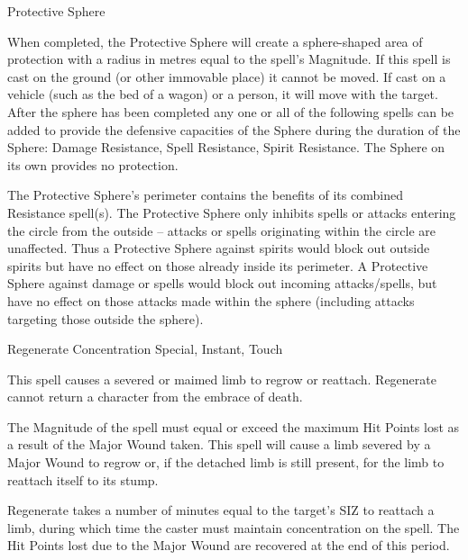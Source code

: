 \begin{rpg-spell}
{Protective Sphere}
{}

When completed, the Protective Sphere will create a sphere-shaped area of protection with a radius in metres equal to the spell’s Magnitude. If this spell is cast on the ground (or other immovable place) it cannot be moved. If cast on a vehicle (such as the bed of a wagon) or a person, it will move with the target. After the sphere has been completed any one or all of the following spells can be added to provide the defensive capacities of the Sphere during the duration of the Sphere: Damage Resistance, Spell Resistance, Spirit Resistance. The Sphere on its own provides no protection.

The Protective Sphere’s perimeter contains the benefits of its combined Resistance spell(s). The Protective Sphere only inhibits spells or attacks entering the circle from the outside – attacks or spells originating within the circle are unaffected. Thus a Protective Sphere against spirits would block out outside spirits but have no effect on those already inside its perimeter. A Protective Sphere against damage or spells would block out incoming attacks/spells, but have no effect on those attacks made within the sphere (including attacks targeting those outside the sphere). 
\end{rpg-spell}


%


\begin{rpg-spell}
{Regenerate}
{Concentration Special, Instant, Touch}

This spell causes a severed or maimed limb to regrow or reattach. Regenerate cannot return a character from the embrace of death. 

The Magnitude of the spell must equal or exceed the maximum Hit Points lost as a result of the Major Wound taken. This spell will cause a limb severed by a Major Wound to regrow or, if the detached limb is still present, for the limb to reattach itself to its stump. 

Regenerate takes a number of minutes equal to the target’s SIZ to reattach a limb, during which time the caster must maintain concentration on the spell. The Hit Points lost due to the Major Wound are recovered at the end of this period.
\end{rpg-spell}


